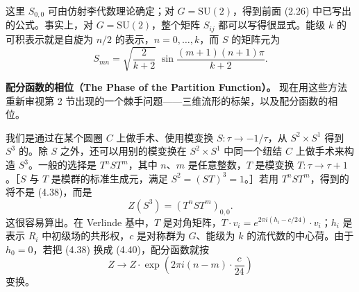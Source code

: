 \documentclass[11pt,a4paper]{article}
\begin{document}
这里 $S_{0,0}$ 可由仿射李代数理论确定；对 $G=\mathrm{SU}(2)$，得到前面 (2.26) 中已写出的公式。事实上，对 $G=\mathrm{SU}(2)$，整个矩阵 $S_{ij}$ 都可以写得很显式。能级 $k$ 的可积表示就是自旋为 $n/2$ 的表示，$n=0,\dots,k$，而 $S$ 的矩阵元为
\begin{equation}
    S_{mn} = \sqrt{\frac{2}{k+2}}\;\sin\frac{(m+1)(n+1)\pi}{k+2}. \tag{4.39}
\end{equation}

\textbf{配分函数的相位（The Phase of the Partition Function）。} 现在用这些方法重新审视第 2 节出现的一个棘手问题——三维流形的标架，以及配分函数的相位。

我们是通过在某个圆圈 $C$ 上做手术、使用模变换 $S\colon\tau\to-1/\tau$，从 $S^2\times S^1$ 得到 $S^3$ 的。除 $S$ 之外，还可以用别的模变换在 $S^2\times S^1$ 中同一个纽结 $C$ 上做手术来构造 $S^3$。一般的选择是 $T^nST^m$，其中 $n$、$m$ 是任意整数，$T$ 是模变换 $T\colon\tau\to\tau+1$。［$S$ 与 $T$ 是模群的标准生成元，满足 $S^2=(ST)^3=1$。］若用 $T^nST^m$，得到的将不是 (4.38)，而是
\begin{equation}
    Z(S^3) = (T^nST^m)_{0,0}. \tag{4.40}
\end{equation}
这很容易算出。在 Verlinde 基中，$T$ 是对角矩阵，$T\cdot v_i=e^{2\pi i(h_i-c/24)}\cdot v_i$；$h_i$ 是表示 $R_i$ 中初级场的共形权，$c$ 是对称群为 $G$、能级为 $k$ 的流代数的中心荷。由于 $h_0=0$，若把 (4.38) 换成 (4.40)，配分函数就按
\begin{equation}
    Z \to Z\cdot\exp\left(2\pi i(n-m)\cdot\frac{c}{24}\right) \tag{4.41}
\end{equation}
变换。
\end{document}
